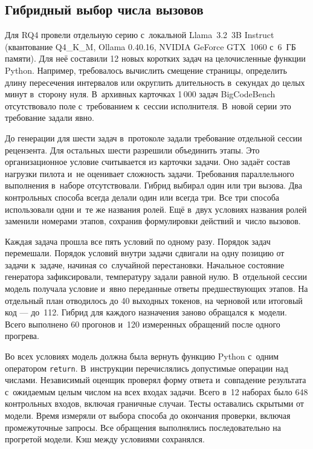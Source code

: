 \subsection{Гибридный выбор числа вызовов}\label{subsec:route-pilot}
Для RQ4 провели отдельную серию с~локальной Llama~3.2~3B Instruct (квантование Q4\_K\_M, Ollama 0.40.16, NVIDIA GeForce GTX~1060 с~6~ГБ памяти). Для неё составили 12 новых коротких задач на целочисленные функции Python. Например, требовалось вычислить смещение страницы, определить длину пересечения интервалов или округлить длительность в~секундах до целых минут в~сторону нуля. В~архивных карточках 1\,000 задач BigCodeBench отсутствовало поле с~требованием к~сессии исполнителя. В~новой серии это требование задали явно.

До генерации для шести задач в~протоколе задали требование отдельной сессии рецензента. Для остальных шести разрешили объединить этапы. Это организационное условие считывается из карточки задачи. Оно задаёт состав нагрузки пилота и~не оценивает сложность задачи. Требования параллельного выполнения в~наборе отсутствовали. Гибрид выбирал один или три вызова. Два контрольных способа всегда делали один или всегда три. Все три способа использовали одни и~те же названия ролей. Ещё в~двух условиях названия ролей заменили номерами этапов, сохранив формулировки действий и~число вызовов.

Каждая задача прошла все пять условий по одному разу. Порядок задач перемешали. Порядок условий внутри задачи сдвигали на одну позицию от задачи к~задаче, начиная со~случайной перестановки. Начальное состояние генератора зафиксировали, температуру задали равной нулю. В~отдельной сессии модель получала условие и~явно переданные ответы предшествующих этапов. На отдельный план отводилось до 40 выходных токенов, на черновой или итоговый код --- до~112. Гибрид для каждого назначения заново обращался к~модели. Всего выполнено 60 прогонов и~120 измеренных обращений после одного прогрева.

Во всех условиях модель должна была вернуть функцию Python с~одним оператором \texttt{return}. В~инструкции перечислялись допустимые операции над числами. Независимый оценщик проверял форму ответа и~совпадение результата с~ожидаемым целым числом на всех входах задачи. Всего в~12 наборах было 648 контрольных входов, включая граничные случаи. Тесты оставались скрытыми от модели. Время измеряли от выбора способа до окончания проверки, включая промежуточные запросы. Все обращения выполнялись последовательно на прогретой модели. Кэш между условиями сохранялся.

